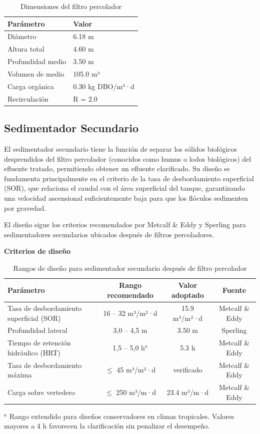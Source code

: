 \documentclass[12pt,a4paper]{article}
\begin{document}
\begin{table}[H]
\centering
\caption{Dimensiones del filtro percolador}
\begin{tabular}{ll}
\toprule
Parámetro & Valor \\
\midrule
Diámetro & 6.18 m \\
Altura total & 4.60 m \\
Profundidad medio & 3.50 m \\
Volumen de medio & 105.0 m³ \\
Carga orgánica & 0.30 kg DBO/m³·d \\
Recirculación & R = 2.0 \\
\bottomrule
\end{tabular}
\end{table}

\subsection{Sedimentador Secundario}

El sedimentador secundario tiene la función de separar los sólidos biológicos desprendidos del filtro percolador (conocidos como humus o lodos biológicos) del efluente tratado, permitiendo obtener un efluente clarificado. Su diseño se fundamenta principalmente en el criterio de la tasa de desbordamiento superficial (SOR), que relaciona el caudal con el área superficial del tanque, garantizando una velocidad ascensional suficientemente baja para que los flóculos sedimenten por gravedad.

El diseño sigue los criterios recomendados por Metcalf \& Eddy \cite{metcalf2014} y Sperling \cite{sperling2007} para sedimentadores secundarios ubicados después de filtros percoladores.

\textbf{Criterios de diseño}

\begin{table}[H]
\centering
\caption{Rangos de diseño para sedimentador secundario después de filtro percolador}
\small
\begin{tabular}{lccc}
\toprule
Parámetro & Rango recomendado & Valor adoptado & Fuente \\
\midrule
Tasa de desbordamiento superficial (SOR) & 16 -- 32 m³/m²·d & 15.9 m³/m²·d & Metcalf \& Eddy \cite{metcalf2014} \\
Profundidad lateral & 3,0 -- 4,5 m & 3.50 m & Sperling \cite{sperling2007} \\
Tiempo de retención hidráulico (HRT) & 1,5 -- 5,0 h$^a$ & 5.3 h & Metcalf \& Eddy \\
Tasa de desbordamiento máxima & $\leq$ 45 m³/m²·d & verificado & Metcalf \& Eddy \\
Carga sobre vertedero & $\leq$ 250 m³/m·d & 23.4 m³/m·d & Metcalf \& Eddy \\
\bottomrule
\end{tabular}
\small
$^a$ Rango extendido para diseños conservadores en climas tropicales. Valores mayores a 4 h favorecen la clarificación sin penalizar el desempeño.
\end{table}
\end{document}
